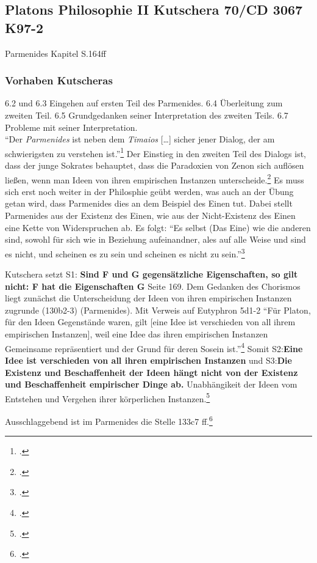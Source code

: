 \documentclass[12pt]{article}
\begin{document}
\subsection*{Platons Philosophie II Kutschera 70/CD 3067 K97-2}
Parmenides Kapitel S.164ff
\subsubsection*{Vorhaben Kutscheras}
6.2 und 6.3 Eingehen auf ersten Teil des Parmenides. 6.4 Überleitung zum zweiten Teil. 6.5 Grundgedanken seiner Interpretation des zweiten Teils. 6.7 Probleme mit seiner Interpretation.\\
\enquote{Der \emph{Parmenides} ist neben dem \emph{Timaios} [\dots] sicher jener Dialog, der am schwierigsten zu verstehen ist.}\footcite[][S. 161]{Kutschera}
Der Einstieg in den zweiten Teil des Dialogs ist, dass der junge Sokrates behauptet, dass die Paradoxien von Zenon sich auflösen ließen, wenn man Ideen von ihren empirischen Instanzen unterscheide.\footcite[vgl.][S. 161]{Kutschera}
Es muss sich erst noch weiter in der Philosphie geübt werden, was auch an der Übung getan wird, dass Parmenides dies an dem Beispiel des Einen tut. Dabei stellt Parmenides aus der Existenz des Einen, wie aus der Nicht-Existenz des Einen eine Kette von Widerspruchen ab. Es folgt: \enquote{Es selbst (Das Eine) wie die anderen sind, sowohl für sich wie in Beziehung aufeinandner, ales auf alle Weise und sind es nicht, und scheinen es zu sein und scheinen es nicht zu sein.}\footcite[vgl.][S. 162]{Kutschera}

Kutschera setzt S1: \textbf{Sind F und G gegensätzliche Eigenschaften, so gilt nicht: F hat die Eigenschaften G}
Seite 169. Dem Gedanken des Chorismos liegt zunächst die Unterscheidung der Ideen von ihren empirischen Instanzen zugrunde (130b2-3) (Parmenides). Mit Verweis auf Eutyphron 5d1-2 
\enquote{Für Platon, für den Ideen Gegenstände waren, gilt [eine Idee ist verschieden von all ihrem empirischen Instanzen], weil eine Idee das ihren empirischen Instanzen Gemeinsame repräsentiert und der Grund für deren Sosein ist.}\footcite[vgl.][S. 169]{Kutschera} Somit S2:\textbf{Eine Idee ist verschieden von all ihren empirischen Instanzen} und S3:\textbf{Die Existenz und Beschaffenheit der Ideen hängt nicht von der Existenz und Beschaffenheit empirischer Dinge ab.} Unabhängikeit der Ideen vom Entstehen und Vergehen ihrer körperlichen Instanzen.\footcite[vgl.][S. 167]{Kutschera}

Ausschlaggebend ist im Parmenides die Stelle 133c7 ff.\footcite[vgl.][S. 179]{Kutschera}
 
\end{document}
